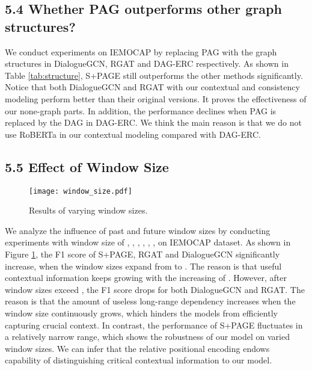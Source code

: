 \documentclass[letterpaper]{article} \usepackage{aaai22}  \usepackage{times}  \usepackage{helvet}  \usepackage{courier}  \usepackage[hyphens]{url}  \usepackage{graphicx} \urlstyle{rm} \def\UrlFont{\rm}  \usepackage{natbib}  \usepackage{caption} \DeclareCaptionStyle{ruled}{labelfont=normalfont,labelsep=colon,strut=off} \frenchspacing  \setlength{\pdfpagewidth}{8.5in}  \setlength{\pdfpageheight}{11in}  \usepackage{algorithm}
\begin{document}
\subsection{5.4 Whether PAG outperforms other graph structures?}
We conduct experiments on IEMOCAP by replacing PAG with the graph structures in DialogueGCN, RGAT and DAG-ERC respectively. 
As shown in Table \ref{tab:structure}, S+PAGE still outperforms the other methods significantly. 
Notice that both DialogueGCN and RGAT with our contextual and consistency modeling perform better than their original versions. It proves the effectiveness of our none-graph parts.
In addition, the performance declines when PAG is replaced by the DAG in DAG-ERC. 
We think the main reason is that we do not use RoBERTa \cite{roberta} in our contextual modeling compared with DAG-ERC.

\subsection{5.5 Effect of Window Size}

\begin{figure}[t]
\centering
\texttt{[image: window\_size.pdf]} \caption{Results of varying window sizes.}
\label{fig6}
\end{figure}

We analyze the influence of past and future window sizes by conducting
experiments with window size  of , , , , , ,  on IEMOCAP dataset. As shown in Figure \ref{fig6}, the F1 score of S+PAGE, RGAT and DialogueGCN significantly increase,
when the window sizes expand from  to .
The reason is that useful contextual information keeps growing with the increasing of .
However, after window sizes exceed , the F1 score drops for both DialogueGCN and RGAT.
The reason is that the amount of useless long-range dependency increases when the window size continuously grows, which hinders the models from efficiently capturing crucial context.
In contrast, the performance of S+PAGE fluctuates in a relatively narrow range, which shows the robustness of our model on varied window sizes. 
We can infer that the relative positional encoding endows capability of distinguishing critical contextual information to our model.
\end{document}
